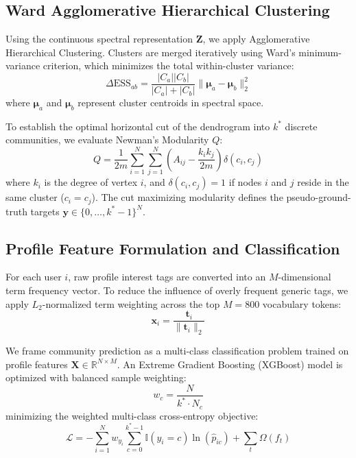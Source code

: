 \documentclass[sn-mathphys,Numbered]{sn-jnl}
\begin{document}
\subsection{Ward Agglomerative Hierarchical Clustering}
Using the continuous spectral representation $\mathbf{Z}$, we apply Agglomerative Hierarchical Clustering. Clusters are merged iteratively using Ward's minimum-variance criterion, which minimizes the total within-cluster variance:
\begin{equation}
\Delta \text{ESS}_{ab} = \frac{|C_a||C_b|}{|C_a| + |C_b|} \|\mathbf{\mu}_a - \mathbf{\mu}_b\|_2^2
\label{eq:ward}
\end{equation}
where $\mathbf{\mu}_a$ and $\mathbf{\mu}_b$ represent cluster centroids in spectral space.

To establish the optimal horizontal cut of the dendrogram into $k^*$ discrete communities, we evaluate Newman's Modularity $Q$:
\begin{equation}
Q = \frac{1}{2m} \sum_{i=1}^N \sum_{j=1}^N \left( A_{ij} - \frac{k_i k_j}{2m} \right) \delta(c_i, c_j)
\label{eq:modularity}
\end{equation}
where $k_i$ is the degree of vertex $i$, and $\delta(c_i, c_j) = 1$ if nodes $i$ and $j$ reside in the same cluster ($c_i = c_j$). The cut maximizing modularity defines the pseudo-ground-truth targets $\mathbf{y} \in \{0, \dots, k^*-1\}^N$.

\subsection{Profile Feature Formulation and Classification}
For each user $i$, raw profile interest tags are converted into an $M$-dimensional term frequency vector. To reduce the influence of overly frequent generic tags, we apply $L_2$-normalized term weighting across the top $M = 800$ vocabulary tokens:
\begin{equation}
\mathbf{x}_i = \frac{\mathbf{t}_i}{\|\mathbf{t}_i\|_2}
\end{equation}

We frame community prediction as a multi-class classification problem trained on profile features $\mathbf{X} \in \mathbb{R}^{N \times M}$. An Extreme Gradient Boosting (XGBoost) model is optimized with balanced sample weighting:
\begin{equation}
w_c = \frac{N}{k^* \cdot N_c}
\end{equation}
minimizing the weighted multi-class cross-entropy objective:
\begin{equation}
\mathcal{L} = -\sum_{i=1}^N w_{y_i} \sum_{c=0}^{k^*-1} \mathbb{I}(y_i = c) \ln(\hat{p}_{ic}) + \sum_{t} \Omega(f_t)
\end{equation}
\end{document}
